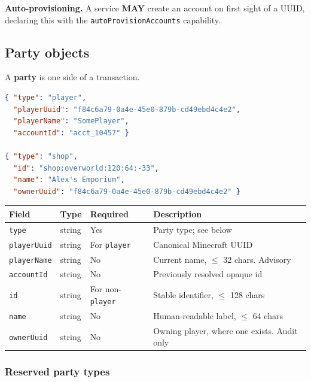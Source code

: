 \documentclass[11pt,a4paper]{article}
\newcommand{\code}[1]{\texttt{\small #1}}
\newcommand{\opt}{\textbf{MAY}}
\begin{document}
\textbf{Auto-provisioning.} A service \opt{} create an account on first sight of a UUID, declaring
this with the \code{autoProvisionAccounts} capability.

\subsection{Party objects}
\label{sec:parties}

A \textbf{party} is one side of a transaction.

\begin{lstlisting}[language=json]
{ "type": "player",
  "playerUuid": "f84c6a79-0a4e-45e0-879b-cd49ebd4c4e2",
  "playerName": "SomePlayer",
  "accountId": "acct_10457" }

{ "type": "shop",
  "id": "shop:overworld:120:64:-33",
  "name": "Alex's Emporium",
  "ownerUuid": "f84c6a79-0a4e-45e0-879b-cd49ebd4c4e2" }
\end{lstlisting}

\begin{tabularx}{\linewidth}{L{2.7cm} L{1.7cm} L{2.5cm} X}
\toprule
\textbf{Field} & \textbf{Type} & \textbf{Required} & \textbf{Description}\\
\midrule
\code{type}       & string & Yes                    & Party type; see below\\
\code{playerUuid} & string & For \code{player}      & Canonical Minecraft UUID\\
\code{playerName} & string & No                     & Current name, $\leq$ 32 chars. Advisory\\
\code{accountId}  & string & No                     & Previously resolved opaque id\\
\code{id}         & string & For non-\code{player}  & Stable identifier, $\leq$ 128 chars\\
\code{name}       & string & No                     & Human-readable label, $\leq$ 64 chars\\
\code{ownerUuid}  & string & No                     & Owning player, where one exists. Audit only\\
\bottomrule
\end{tabularx}

\subsubsection*{Reserved party types}
\end{document}
